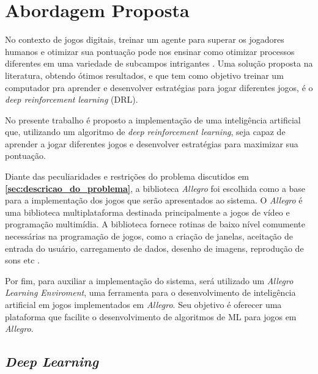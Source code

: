 \chapter{Abordagem Proposta}
\label{chap:abordagem}


No contexto de jogos digitais, treinar um agente para superar os jogadores humanos e otimizar sua pontuação pode nos ensinar como otimizar processos diferentes em uma variedade de subcampos intrigantes \cite{comi:teach:AI:DRL:2018}. Uma solução proposta na literatura, obtendo ótimos resultados, e que tem como objetivo treinar um computador pra aprender e desenvolver estratégias para jogar diferentes jogos, é o \textit{deep reinforcement learning} (DRL). 

No presente trabalho é proposto a implementação de uma inteligência artificial que, utilizando um algoritmo de \textit{deep reinforcement learning}, seja capaz de aprender a jogar diferentes jogos e desenvolver estratégias para maximizar sua pontuação.

Diante das peculiaridades e restrições do problema discutidos em \textbf{\ref{sec:descricao_do_problema}}, a biblioteca \textit{Allegro} foi escolhida como a base para a implementação dos jogos que serão apresentados ao sistema.
O \textit{Allegro} é uma biblioteca multiplataforma destinada principalmente a jogos de vídeo e programação multimídia. A biblioteca fornece rotinas de baixo nível comumente necessárias na programação de jogos, como a criação de janelas, aceitação de entrada do usuário, carregamento de dados, desenho de imagens, reprodução de sons etc \cite{allegro}.

Por fim, para auxiliar a implementação do sistema, será utilizado um \textit{Allegro Learning Enviroment}, uma ferramenta para o desenvolvimento de inteligência artificial em jogos implementados em \textit{Allegro}. Seu objetivo é oferecer uma plataforma que facilite o desenvolvimento de algoritmos de ML para jogos em \textit{Allegro}.



\section{\textit{Deep Learning}}


